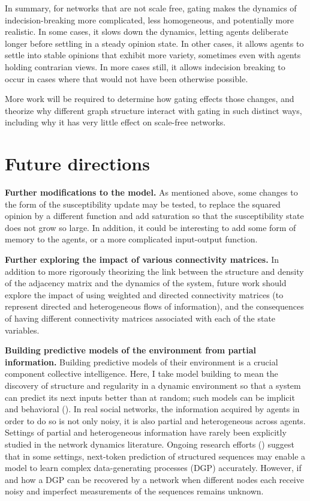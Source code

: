 \documentclass[]{article}
\begin{document}
In summary, for networks that are not scale free, gating makes the dynamics of indecision-breaking more complicated, less homogeneous, and potentially more realistic. In some cases, it slows down the dynamics, letting agents deliberate longer before settling in a steady opinion state. In other cases, it allows agents to settle into stable opinions that exhibit more variety, sometimes even with agents holding contrarian views. In more cases still, it allows indecision breaking to occur in cases where that would not have been otherwise possible.

More work will be required to determine how gating effects those changes, and theorize why different graph structure interact with gating in such distinct ways, including why it has very little effect on scale-free networks. 

\newpage

\section{Future directions}

\textbf{Further modifications to the model.} As mentioned above, some changes to the form of the susceptibility update may be tested, to replace the squared opinion by a different function and add saturation so that the susceptibility state does not grow so large. In addition, it could be interesting to add some form of memory to the agents, or a more complicated input-output function.

\textbf{Further exploring the impact of various connectivity matrices.} In addition to more rigorously theorizing the link between the structure and density of the adjacency matrix and the dynamics of the system, future work should explore the impact of using weighted and directed connectivity matrices (to represent directed and heterogeneous flows of information), and the consequences of having different connectivity matrices associated with each of the state variables.

\textbf{Building predictive models of the environment from partial information.} Building predictive models of their environment is a crucial component collective intelligence. Here, I take model building to mean the discovery of structure and regularity in a dynamic environment so that a system can predict its next inputs better than at random; such models can be implicit and behavioral (\cite{crutchfieldCalculiEmergenceComputation1994}). In real social networks, the information acquired by agents in order to do so is not only noisy, it is also partial and heterogeneous across agents. Settings of partial and heterogeneous information have rarely been explicitly studied in the network dynamics literature. Ongoing research efforts (\cite{malachAutoRegressiveNextTokenPredictors2023}) suggest that in some settings, next-token prediction of structured sequences may enable a model to learn complex data-generating processes (DGP) accurately. However, if and how a DGP can be recovered by a network when different nodes each receive noisy and imperfect measurements of the sequences remains unknown.
\end{document}
